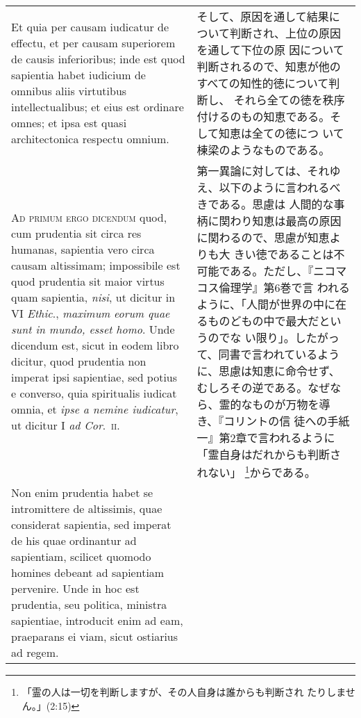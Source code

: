 \documentclass[10pt]{jsarticle}
\begin{document}
\begin{longtable}{p{21em}p{21em}}
\\



 Et quia per causam iudicatur
de effectu, et per causam superiorem de causis inferioribus; inde est
quod sapientia habet iudicium de omnibus aliis virtutibus
intellectualibus; et eius est ordinare omnes; et ipsa est quasi
architectonica respectu omnium.


&

 そして、原因を通して結果について判断され、上位の原因を通して下位の原
 因について判断されるので、知恵が他のすべての知性的徳について判断し、
 それら全ての徳を秩序付けるのもの知恵である。そして知恵は全ての徳につ
 いて棟梁のようなものである。

\\




{\scshape Ad primum ergo dicendum} quod, cum prudentia sit circa res
humanas, sapientia vero circa causam altissimam; impossibile est quod
prudentia sit maior virtus quam sapientia, {\itshape nisi}, ut dicitur
in VI {\itshape Ethic}., {\itshape maximum eorum quae sunt in mundo,
esset homo}. Unde dicendum est, sicut in eodem libro dicitur, quod
prudentia non imperat ipsi sapientiae, sed potius e converso, quia
spiritualis iudicat omnia, et {\itshape ipse a nemine iudicatur}, ut
 dicitur I {\itshape ad Cor}.~{\scshape ii}.


&

 第一異論に対しては、それゆえ、以下のように言われるべきである。思慮は
 人間的な事柄に関わり知恵は最高の原因に関わるので、思慮が知恵よりも大
 きい徳であることは不可能である。ただし、『ニコマコス倫理学』第6巻で言
 われるように、「人間が世界の中に在るものどもの中で最大だというのでな
 い限り」。したがって、同書で言われているように、思慮は知恵に命令せず、
 むしろその逆である。なぜなら、霊的なものが万物を導き、『コリントの信
 徒への手紙一』第2章で言われるように「霊自身はだれからも判断されない」
 \footnote{「霊の人は一切を判断しますが、その人自身は誰からも判断され
 たりしません。」(2:15) }からである。
 
 

\\


 Non enim prudentia habet se intromittere de altissimis, quae
considerat sapientia, sed imperat de his quae ordinantur ad
sapientiam, scilicet quomodo homines debeant ad sapientiam
pervenire. Unde in hoc est prudentia, seu politica, ministra
sapientiae, introducit enim ad eam, praeparans ei viam, sicut
ostiarius ad regem.



\end{longtable}
\end{document}
